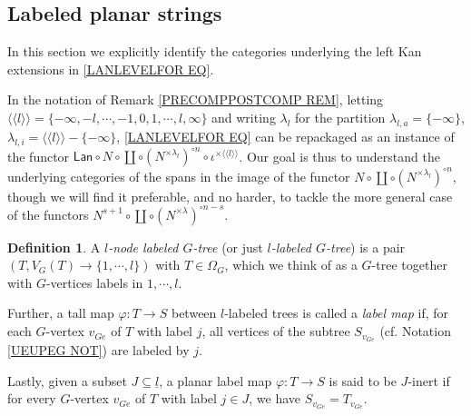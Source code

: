 \documentclass[a4paper,10pt
,draft
]{article}%
\numberwithin{equation}{section}
\numberwithin{figure}{section}
\theoremstyle{definition} %
\newtheorem{definition}[equation]{Definition}%
\newcommand{\1}{\ensuremath{\mathbbm 1}}%
\begin{document}
\subsection{Labeled planar strings}\label{LABELSTRI SEC}


In this section we explicitly identify the categories underlying the left Kan extensions in \eqref{LANLEVELFOR EQ}.


In the notation 
of Remark \ref{PRECOMPPOSTCOMP REM},
letting 
$\langle \langle l 
\rangle \rangle = 
\{-\infty,-l,\cdots, -1, 0, 1, \cdots, l, \infty\}$ and writing
$\lambda_{l}$ for the partition
$\lambda_{l,a} = \{-\infty\}$,
$\lambda_{l,i} = 
\langle \langle l \rangle \rangle - \{-\infty\}$,
\eqref{LANLEVELFOR EQ}
can be repackaged as an instance of the functor
$\mathsf{Lan} \circ N \circ \coprod \circ (N^{\times \lambda_l})^{\circ n}\circ \iota^{\times \langle \langle l \rangle \rangle}$.
Our goal is thus to understand 
the underlying categories of the spans in the image of the functor
$N \circ \coprod \circ (N^{\times \lambda_l})^{\circ n}$,
though we will find it preferable, and no harder, to tackle the more general case of the functors 
$N^{s+1} \circ \coprod \circ (N^{\times \lambda})^{\circ n-s}$.

\begin{definition}\label{LABMAP DEF}
A \textit{$l$-node labeled $G$-tree} (or just \textit{$l$-labeled $G$-tree}) is a pair $(T,V_G(T) \to \{1,\cdots,l\})$ with $T \in \Omega_G$, which we think of as a $G$-tree together with $G$-vertices labels in $1,\cdots,l$.

Further, a tall map $\varphi \colon T \to S$ between $l$-labeled trees is called a \textit{label map} if, for each $G$-vertex $v_{G e}$ of $T$ with label $j$, all vertices of the subtree $S_{v_{G e}}$ 
(cf. Notation \ref{UEUPEG NOT}) are labeled by $j$.

Lastly, given a subset $J \subseteq \underline{l}$, a planar label map $\varphi \colon T \to S$ is said to be $J$-inert if for every $G$-vertex $v_{G e}$ of $T$ with label $j \in J$, we have $S_{v_{Ge}} = T_{v_{Ge}}$.
\end{definition}
\end{document}
